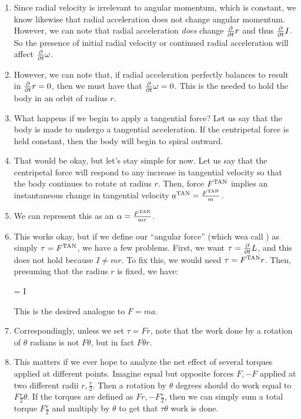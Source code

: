 \begin{enumerate}
  \item Since radial velocity is irrelevant to angular momentum, which
  is constant, we know likewise that radial acceleration does not change
  angular momentum. However, we can note that radial acceleration
  \emph{does} change $\frac{\partial }{\partial t} r$ and thus $\frac{\partial }{\partial t} I$. So the
  presence of initial radial velocity or continued radial acceleration
  will affect $\frac{\partial }{\partial t} \omega$.

  \item However, we can note that, if radial acceleration perfectly
  balances to result in $\frac{\partial }{\partial t} r = 0$, then we must have that
  $\frac{\partial }{\partial t} \omega = 0$. This is the 
  needed to hold the body in an orbit of radius $r$.

  \item What happens if we begin to apply a tangential force? Let us say
  that the body is made to undergo a tangential acceleration. If the
  centripetal force is held constant, then the body will begin to spiral
  outward.

  \item That would be okay, but let's stay simple for now. Let us say
  that the centripetal force will respond to any increase in tangential
  velocity so that the body continues to rotate at radius $r$. Then,
  force $F^{\text{TAN}}$ implies an instantaneous change in tangential velocity
  $a^{\text{TAN}} = \frac{F^{\text{TAN}}}{m}$.

  \item We can represent this as an 
  $\alpha = \frac{F^{\text{TAN}}}{mr}$.

  \item This works okay, but if we define our ``angular force'' (which
  wea call ) as simply $\tau = F^{\text{TAN}}$, we have a few
  problems. First, we want $\tau = \frac{\partial }{\partial t} L$, and this does not
  hold because $I \ne mr$. To fix this, we would need $\tau = F^{\text{TAN}} r$.
  Then, presuming that the radius $r$ is fixed, we have:

  \begin{nedqn}
    \tau = I \alpha
  \end{nedqn}

  \noindent
  This is the desired analogue to $F = ma$.

  \item Correspondingly, unless we set $\tau = Fr$, note that the work
  done by a rotation of $\theta$ radians is not $F\theta$, but in fact
  $F\theta r$.

  \item This matters if we ever hope to analyze the net effect of
  several torques applied at different points. Imagine equal but
  opposite forces $F, -F$ applied at two different radii $r,
  \frac{r}{2}$. Then a rotation by $\theta$ degrees should do work equal
  to $F \frac{r}{2} \theta$. If the torques are defined as $Fr,
  -F\frac{r}{2}$, then we can simply sum a total torque $F\frac{r}{2}$
  and multiply by $\theta$ to get that $\tau \theta$ work is done.
\end{enumerate}
